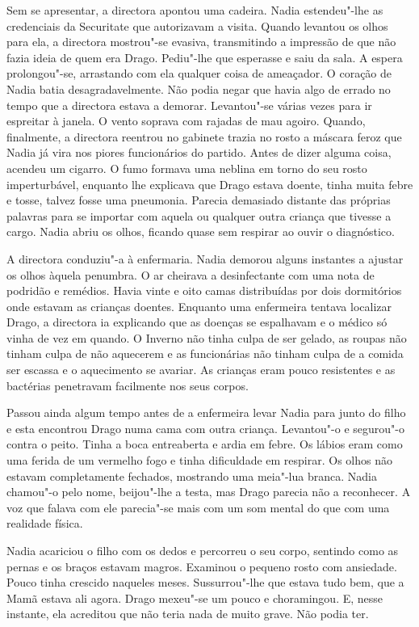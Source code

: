 Sem se apresentar, a directora apontou uma cadeira. Nadia estendeu"-lhe
as credenciais da Securitate que autorizavam a visita. Quando levantou
os olhos para ela, a directora mostrou"-se evasiva, transmitindo a
impressão de que não fazia ideia de quem era Drago. Pediu"-lhe que esperasse e saiu da sala. A espera prolongou"-se, arrastando com ela qualquer
coisa de ameaçador. O coração de Nadia batia desagradavelmente. Não
podia negar que havia algo de errado no tempo que a directora estava a
demorar. Levantou"-se várias vezes para ir espreitar à janela. O vento
soprava com rajadas de mau agoiro. Quando, finalmente, a directora
reentrou no gabinete trazia no rosto a máscara feroz que Nadia já vira
nos piores funcionários do partido. Antes de dizer alguma coisa, acendeu
um cigarro. O fumo formava uma neblina em torno do seu rosto
imperturbável, enquanto lhe explicava que Drago estava doente, tinha
muita febre e tosse, talvez fosse uma pneumonia. Parecia demasiado
distante das próprias palavras para se importar com aquela ou qualquer
outra criança que tivesse a cargo. Nadia abriu os olhos, ficando quase
sem respirar ao ouvir o diagnóstico.

A directora conduziu"-a à enfermaria. Nadia demorou
alguns instantes a ajustar os olhos àquela penumbra. O ar cheirava a
desinfectante com uma nota de podridão e remédios. Havia vinte e oito
camas distribuídas por dois dormitórios onde estavam as crianças
doentes. Enquanto uma enfermeira tentava localizar Drago, a directora ia
explicando que as doenças se espalhavam e o médico só vinha de vez em
quando. O Inverno não tinha culpa de ser gelado, as roupas não tinham
culpa de não aquecerem e as funcionárias não tinham culpa de a comida
ser escassa e o aquecimento se avariar. As crianças eram pouco
resistentes e as bactérias penetravam facilmente nos seus corpos.

Passou ainda algum tempo antes de a enfermeira levar Nadia para junto do
filho e esta encontrou Drago numa
cama com outra criança. Levantou"-o e segurou"-o contra o peito. Tinha a
boca entreaberta e ardia em febre. Os lábios eram como uma ferida de um
vermelho fogo e tinha dificuldade em respirar. Os olhos não estavam
completamente fechados, mostrando uma meia"-lua branca. Nadia chamou"-o
pelo nome, beijou"-lhe a testa, mas Drago parecia não a reconhecer. A voz
que falava com ele parecia"-se mais com um som mental do que com uma
realidade física.

Nadia acariciou o filho com os dedos e percorreu o seu corpo, sentindo
como as pernas e os braços estavam magros. Examinou o pequeno rosto com
ansiedade. Pouco tinha crescido naqueles meses. Sussurrou"-lhe que estava
tudo bem, que a Mamã estava ali agora. Drago mexeu"-se um pouco e
choramingou. E, nesse instante, ela acreditou que não teria nada de
muito grave. Não podia ter.

